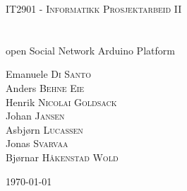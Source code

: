 \begin{titlepage}
	\begin{center}
		\textsc{\Large IT2901 - Informatikk Prosjektarbeid II}\\[0.5cm]
		\HRule \\[0.6cm]
		{ \huge \bfseries \project}\\[0.4cm]
		open Social Network Arduino Platform
		\HRule \\[1.5cm]
		\begin{center} \large
			Emanuele \textsc{Di Santo} \\
			Anders \textsc{Behne Eie} \\
			Henrik \textsc{Nicolai Goldsack} \\
			Johan \textsc{Jansen} \\
			Asbjørn \textsc{Lucassen} \\
			Jonas \textsc{Svarvaa} \\
			Bjørnar \textsc{Håkenstad Wold}
		\end{center}
		\vfill
		{\large \today}
	\end{center}
\end{titlepage}
